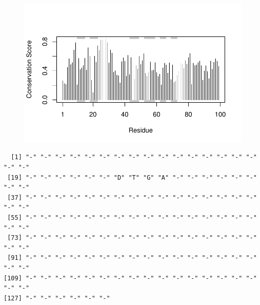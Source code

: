 \documentclass[
  letterpaper,
  DIV=11,
  numbers=noendperiod]{scrartcl}
\newenvironment{Shaded}{\begin{snugshade}}{\end{snugshade}}
\newcommand{\AttributeTok}[1]{\textcolor[rgb]{0.40,0.45,0.13}{#1}}
\newcommand{\DecValTok}[1]{\textcolor[rgb]{0.68,0.00,0.00}{#1}}
\newcommand{\FloatTok}[1]{\textcolor[rgb]{0.68,0.00,0.00}{#1}}
\newcommand{\FunctionTok}[1]{\textcolor[rgb]{0.28,0.35,0.67}{#1}}
\newcommand{\NormalTok}[1]{\textcolor[rgb]{0.00,0.23,0.31}{#1}}
\newcommand{\OtherTok}[1]{\textcolor[rgb]{0.00,0.23,0.31}{#1}}
\newcommand{\SpecialCharTok}[1]{\textcolor[rgb]{0.37,0.37,0.37}{#1}}
\newcommand{\StringTok}[1]{\textcolor[rgb]{0.13,0.47,0.30}{#1}}
\begin{document}
\begin{figure}[H]

{\centering \includegraphics{Class11INCLASS_files/figure-pdf/unnamed-chunk-38-1.pdf}

}

\end{figure}

\begin{Shaded}
\end{Shaded}

\begin{verbatim}
  [1] "-" "-" "-" "-" "-" "-" "-" "-" "-" "-" "-" "-" "-" "-" "-" "-" "-" "-"
 [19] "-" "-" "-" "-" "-" "-" "D" "T" "G" "A" "-" "-" "-" "-" "-" "-" "-" "-"
 [37] "-" "-" "-" "-" "-" "-" "-" "-" "-" "-" "-" "-" "-" "-" "-" "-" "-" "-"
 [55] "-" "-" "-" "-" "-" "-" "-" "-" "-" "-" "-" "-" "-" "-" "-" "-" "-" "-"
 [73] "-" "-" "-" "-" "-" "-" "-" "-" "-" "-" "-" "-" "-" "-" "-" "-" "-" "-"
 [91] "-" "-" "-" "-" "-" "-" "-" "-" "-" "-" "-" "-" "-" "-" "-" "-" "-" "-"
[109] "-" "-" "-" "-" "-" "-" "-" "-" "-" "-" "-" "-" "-" "-" "-" "-" "-" "-"
[127] "-" "-" "-" "-" "-" "-"
\end{verbatim}

\begin{Shaded}
\end{Shaded}
\end{document}
